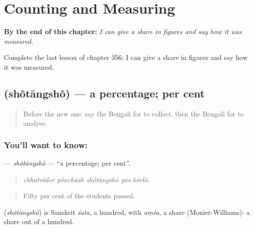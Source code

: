 
\chapter{Counting and Measuring}
\label{ch:bn-counting-and-measuring}

\begin{chapteropening}
\textbf{By the end of this chapter:} \emph{I can give a share in figures and say how it was measured.}

Complete the last lesson of chapter 356: I can give a share in figures and say how it was measured.
\end{chapteropening}

\section[\texorpdfstring{\bn{শতাংশ} (shôtāngshô)}{শতাংশ (shôtāngshô)}]{ (shôtāngshô) — a percentage; per cent}

\label{lesson:BN-C356-shotangsho}



\begin{quote}
Before the new one: say the Bengali for to collect, then the Bengali for to analyse.
\end{quote}

\subsection*{You'll want to know: }
\textbf{} — \emph{shôtāngshô} — \textquotedblleft{}a percentage; per cent\textquotedblright{}.

\begin{quote}
    
\end{quote}

\begin{quote}
\emph{chhātrôder pônchāsh shôtāngshô pās kôrlô.}
\end{quote}

\begin{quote}
Fifty per cent of the students passed.
\end{quote}

\begin{cousinweb}
\textbf{} (\emph{shôtāngshô}) is Sanskrit \emph{śata}, a hundred, with \emph{aṃśa}, a share (Monier-Williams): a share out of a hundred.
\end{cousinweb}

